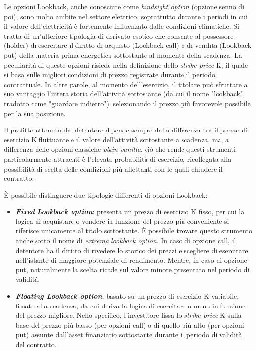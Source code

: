 \documentclass[12pt,a4paper]{report}
\begin{document}
Le opzioni Lookback, anche conosciute come \textit{hindsight option} (opzione senno di poi), sono molto ambite nel settore elettrico, soprattutto durante i periodi in cui il valore dell'elettricità è fortemente influenzato dalle condizioni climatiche. Si tratta di un'ulteriore tipologia di derivato esotico che consente al possessore (holder) di esercitare il diritto di acquisto (Lookback call) o di vendita (Lookback put) della materia prima energetica sottostante al momento della scadenza. La peculiarità di queste opzioni risiede nella definizione dello \textit{strike price} K, il quale si basa sulle migliori condizioni di prezzo registrate durante il periodo contrattuale. In altre parole, al momento dell'esercizio, il titolare può sfruttare a suo vantaggio l'intera storia dell'attività sottostante (da cui il nome "lookback", tradotto come "guardare indietro"), selezionando il prezzo più favorevole possibile per la sua posizione.

Il profitto ottenuto dal detentore dipende sempre dalla differenza tra il prezzo di esercizio K fluttuante e il valore dell'attività sottostante a scadenza, ma, a differenza delle opzioni classiche \textit{plain vanilla}, ciò che rende questi strumenti particolarmente attraenti è l'elevata probabilità di esercizio, ricollegata alla possibilità di scelta delle condizioni più allettanti con le quali chiudere il contratto.

È possibile distinguere due tipologie differenti di opzioni Lookback:

\begin{itemize}
    \item \textbf{\textit{Fixed Lookback option}}: presenta un prezzo di esercizio K fisso, per cui la logica di acquistare o vendere in funzione del prezzo più conveniente si riferisce unicamente al titolo sottostante. È possibile trovare questo strumento anche sotto il nome di \textit{extrema lookback option}.
    In caso di opzione call, il detentore ha il diritto di rivedere lo storico dei prezzi e scegliere di esercitare nell'istante di maggiore potenziale di rendimento. Mentre, in caso di opzione put, naturalmente la scelta ricade sul valore minore presentato nel periodo di validità. 
    \item \textbf{\textit{Floating Lookback option}}: basato su un prezzo di esercizio K variabile, fissato alla scadenza, da cui deriva la logica di esercitare o meno in funzione del prezzo migliore. Nello specifico, l'investitore fissa lo \textit{strike price} K sulla base del prezzo più basso (per opzioni call) o di quello più alto (per opzioni put) assunte dall'asset finanziario sottostante durante il periodo di validità del contratto.
\end{itemize}
\end{document}
